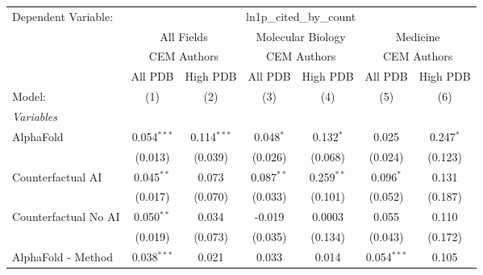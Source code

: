 \begingroup
\centering
\begin{tabular}{lcccccc}
   \tabularnewline \midrule \midrule
   Dependent Variable: & \multicolumn{6}{c}{ln1p\_cited\_by\_count}\\
 & \multicolumn{2}{c}{All Fields} & \multicolumn{2}{c}{Molecular Biology} & \multicolumn{2}{c}{Medicine} \\
\cmidrule(lr){2-3} \cmidrule(lr){4-5} \cmidrule(lr){6-7}
 & \multicolumn{2}{c}{CEM Authors} & \multicolumn{2}{c}{CEM Authors} & \multicolumn{2}{c}{CEM Authors} \\
\cmidrule(lr){2-3} \cmidrule(lr){4-5} \cmidrule(lr){6-7}
 & \multicolumn{1}{c}{All PDB} & \multicolumn{1}{c}{High PDB} & \multicolumn{1}{c}{All PDB} & \multicolumn{1}{c}{High PDB} & \multicolumn{1}{c}{All PDB} & \multicolumn{1}{c}{High PDB} \\
\cmidrule(lr){2-2} \cmidrule(lr){3-3} \cmidrule(lr){4-4} \cmidrule(lr){5-5} \cmidrule(lr){6-6} \cmidrule(lr){7-7}
   Model:                                                     & (1)           & (2)           & (3)          & (4)          & (5)           & (6)\\  
   \midrule
   \emph{Variables}\\
   AlphaFold                                                  & 0.054$^{***}$ & 0.114$^{***}$ & 0.048$^{*}$  & 0.132$^{*}$  & 0.025         & 0.247$^{*}$\\   
                                                              & (0.013)       & (0.039)       & (0.026)      & (0.068)      & (0.024)       & (0.123)\\   
   Counterfactual AI                                          & 0.045$^{**}$  & 0.073         & 0.087$^{**}$ & 0.259$^{**}$ & 0.096$^{*}$   & 0.131\\   
                                                              & (0.017)       & (0.070)       & (0.033)      & (0.101)      & (0.052)       & (0.187)\\   
   Counterfactual No AI                                       & 0.050$^{**}$  & 0.034         & -0.019       & 0.0003       & 0.055         & 0.110\\   
                                                              & (0.019)       & (0.073)       & (0.035)      & (0.134)      & (0.043)       & (0.172)\\   
   AlphaFold - Method                                         & 0.038$^{***}$ & 0.021         & 0.033        & 0.014        & 0.054$^{***}$ & 0.105\\   

\end{tabular}
